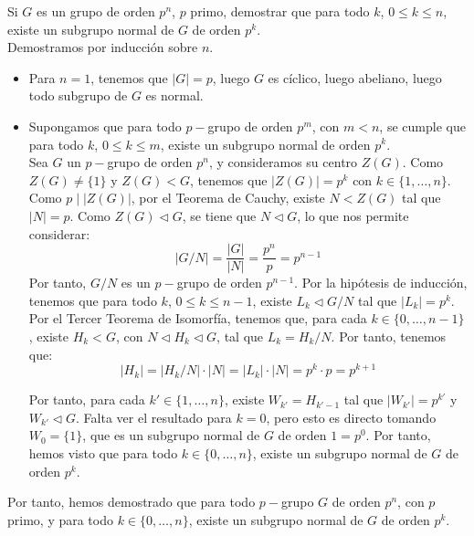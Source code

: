 \begin{ejercicio}\label{ej:6.19}
    Si $G$ es un grupo de orden $p^n$, $p$ primo, demostrar que para todo $k$, $0 \leq k \leq n$, existe un subgrupo normal de $G$ de orden $p^k$.\\

    Demostramos por inducción sobre $n$.
    \begin{itemize}
        \item Para $n=1$, tenemos que $|G|=p$, luego $G$ es cíclico, luego abeliano, luego todo subgrupo de $G$ es normal.
        \item Supongamos que para todo $p-$grupo de orden $p^m$, con $m<n$, se cumple que para todo $k$, $0\leq k\leq m$, existe un subgrupo normal de orden $p^k$.\\
        
        Sea $G$ un $p-$grupo de orden $p^n$, y consideramos su centro $Z(G)$. Como $Z(G)\neq \{1\}$ y $Z(G)<G$, tenemos que $|Z(G)|=p^k$ con $k\in \{1,\ldots,n\}$. Como $p\mid |Z(G)|$, por el Teorema de Cauchy, existe $N<Z(G)$ tal que $|N|=p$. Como $Z(G)\lhd G$, se tiene que $N\lhd G$, lo que nos permite considerar:
        \begin{equation*}
            |G/N| = \dfrac{|G|}{|N|} = \dfrac{p^n}{p} = p^{n-1}
        \end{equation*}
        Por tanto, $G/N$ es un $p-$grupo de orden $p^{n-1}$. Por la hipótesis de inducción, tenemos que para todo $k$, $0\leq k\leq n-1$, existe $L_k\lhd G/N$ tal que $|L_k|=p^k$. Por el Tercer Teorema de Isomorfía, tenemos que, para cada $k\in \{0,\ldots,n-1\}$, existe $H_k<G$, con $N\lhd H_k\lhd G$, tal que $L_k=H_k/N$. Por tanto, tenemos que:
        \begin{equation*}
            |H_k| = |H_k/N| \cdot |N| = |L_k| \cdot |N| = p^k\cdot p = p^{k+1}
        \end{equation*}

        Por tanto, para cada $k'\in \{1,\ldots,n\}$, existe $W_{k'}=H_{k'-1}$ tal que $|W_{k'}|=p^{k'}$ y $W_{k'}\lhd G$. Falta ver el resultado para $k=0$, pero esto es directo tomando $W_0 = \{1\}$, que es un subgrupo normal de $G$ de orden $1=p^0$.
        Por tanto, hemos visto que para todo $k\in \{0,\ldots,n\}$, existe un subgrupo normal de $G$ de orden $p^k$.
    \end{itemize}
    Por tanto, hemos demostrado que para todo $p-$grupo $G$ de orden $p^n$, con $p$ primo, y para todo $k\in \{0,\ldots,n\}$, existe un subgrupo normal de $G$ de orden $p^k$.
\end{ejercicio}

